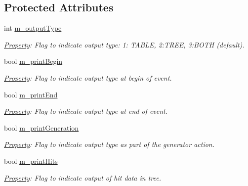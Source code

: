 \subsection*{Protected Attributes}
\begin{DoxyCompactItemize}
\item 
int \hyperlink{class_d_d4hep_1_1_simulation_1_1_geant4_particle_print_a0dc2b81ac74da2e496892d9cccf30f56}{m\_\-outputType}
\begin{DoxyCompactList}\small\item\em \hyperlink{class_d_d4hep_1_1_property}{Property}: Flag to indicate output type: 1: TABLE, 2:TREE, 3:BOTH (default). \item\end{DoxyCompactList}\item 
bool \hyperlink{class_d_d4hep_1_1_simulation_1_1_geant4_particle_print_a876b6bca1f7dc285d064785ddf9838a2}{m\_\-printBegin}
\begin{DoxyCompactList}\small\item\em \hyperlink{class_d_d4hep_1_1_property}{Property}: Flag to indicate output type at begin of event. \item\end{DoxyCompactList}\item 
bool \hyperlink{class_d_d4hep_1_1_simulation_1_1_geant4_particle_print_a1c439ecc16654cace16881a0c6a1414c}{m\_\-printEnd}
\begin{DoxyCompactList}\small\item\em \hyperlink{class_d_d4hep_1_1_property}{Property}: Flag to indicate output type at end of event. \item\end{DoxyCompactList}\item 
bool \hyperlink{class_d_d4hep_1_1_simulation_1_1_geant4_particle_print_aa9e8a756d0ffc2d753d32941780d8f99}{m\_\-printGeneration}
\begin{DoxyCompactList}\small\item\em \hyperlink{class_d_d4hep_1_1_property}{Property}: Flag to indicate output type as part of the generator action. \item\end{DoxyCompactList}\item 
bool \hyperlink{class_d_d4hep_1_1_simulation_1_1_geant4_particle_print_ab411968553cdfbc30a79a385c0fa25c4}{m\_\-printHits}
\begin{DoxyCompactList}\small\item\em \hyperlink{class_d_d4hep_1_1_property}{Property}: Flag to indicate output of hit data in tree. \item\end{DoxyCompactList}\end{DoxyCompactItemize}


